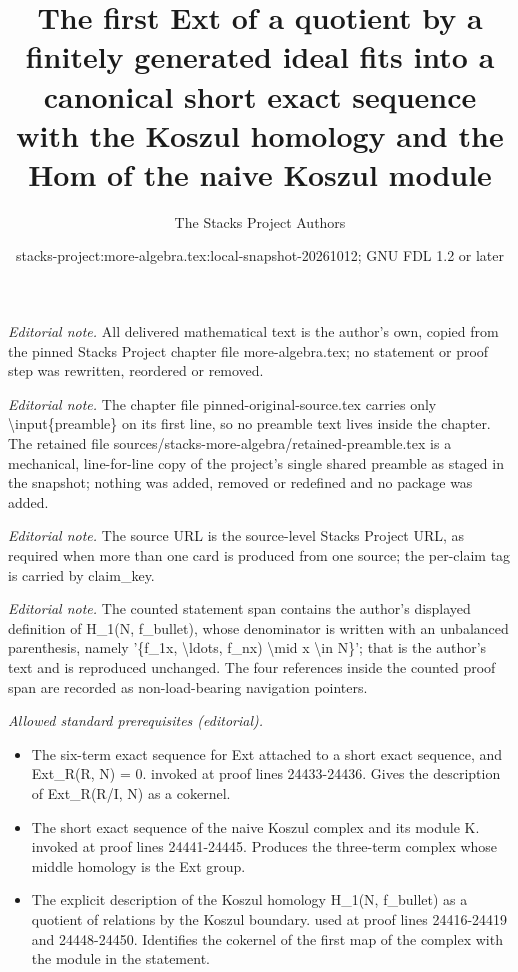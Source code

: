 \documentclass[10pt,a4paper]{amsart}
\title{The first Ext of a quotient by a finitely generated ideal fits into a canonical short exact sequence with the Koszul homology and the Hom of the naive Koszul module}
\author{The Stacks Project Authors}
\date{stacks-project:more-algebra.tex:local-snapshot-20261012; GNU FDL 1.2 or later}
\theoremstyle{plain}
\theoremstyle{definition}
\theoremstyle{remark}
\numberwithin{equation}{subsection}
\begin{document}
\maketitle
\setcounter{subsection}{1}
\noindent\textit{Editorial note.} All delivered mathematical text is the author's own, copied from the pinned Stacks Project chapter file more-algebra.tex; no statement or proof step was rewritten, reordered or removed.\par\medskip
\noindent\textit{Editorial note.} The chapter file pinned-original-source.tex carries only \textbackslash{}input\{preamble\} on its first line, so no preamble text lives inside the chapter. The retained file sources/stacks-more-algebra/retained-preamble.tex is a mechanical, line-for-line copy of the project's single shared preamble as staged in the snapshot; nothing was added, removed or redefined and no package was added.\par\medskip
\noindent\textit{Editorial note.} The source URL is the source-level Stacks Project URL, as required when more than one card is produced from one source; the per-claim tag is carried by claim\_key.\par\medskip
\noindent\textit{Editorial note.} The counted statement span contains the author's displayed definition of H\_1(N, f\_bullet), whose denominator is written with an unbalanced parenthesis, namely '\{f\_1x, \textbackslash{}ldots, f\_nx) \textbackslash{}mid x \textbackslash{}in N\}'; that is the author's text and is reproduced unchanged. The four references inside the counted proof span are recorded as non-load-bearing navigation pointers.\par\medskip
\noindent\textit{Allowed standard prerequisites (editorial).}\begin{itemize}
\item The six-term exact sequence for Ext attached to a short exact sequence, and Ext\_R(R, N) = 0. invoked at proof lines 24433-24436. Gives the description of Ext\_R(R/I, N) as a cokernel.
\item The short exact sequence of the naive Koszul complex and its module K. invoked at proof lines 24441-24445. Produces the three-term complex whose middle homology is the Ext group.
\item The explicit description of the Koszul homology H\_1(N, f\_bullet) as a quotient of relations by the Koszul boundary. used at proof lines 24416-24419 and 24448-24450. Identifies the cokernel of the first map of the complex with the module in the statement.
\end{itemize}\medskip
\end{document}
